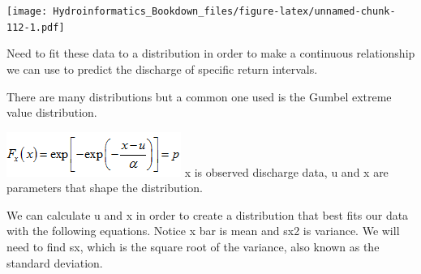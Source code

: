 \documentclass[
]{book}
\newenvironment{Shaded}{\begin{snugshade}}{\end{snugshade}}
\newcommand{\AttributeTok}[1]{\textcolor[rgb]{0.77,0.63,0.00}{#1}}
\newcommand{\CommentTok}[1]{\textcolor[rgb]{0.56,0.35,0.01}{\textit{#1}}}
\newcommand{\DecValTok}[1]{\textcolor[rgb]{0.00,0.00,0.81}{#1}}
\newcommand{\FloatTok}[1]{\textcolor[rgb]{0.00,0.00,0.81}{#1}}
\newcommand{\FunctionTok}[1]{\textcolor[rgb]{0.00,0.00,0.00}{#1}}
\newcommand{\NormalTok}[1]{#1}
\newcommand{\OtherTok}[1]{\textcolor[rgb]{0.56,0.35,0.01}{#1}}
\newcommand{\SpecialCharTok}[1]{\textcolor[rgb]{0.00,0.00,0.00}{#1}}
\begin{document}
\begin{Shaded}
\end{Shaded}

\texttt{[image: Hydroinformatics\_Bookdown\_files/figure-latex/unnamed-chunk-112-1.pdf]}

Need to fit these data to a distribution in order to make a continuous relationship we can use to predict the discharge of specific return intervals.

There are many distributions but a common one used is the Gumbel extreme value distribution.

\includegraphics{images/gumbel.png}
x is observed discharge data, u and x are parameters that shape the distribution.

We can calculate u and x in order to create a distribution that best fits our data with the following equations. Notice x bar is mean and sx2 is variance. We will need to find sx, which is the square root of the variance, also known as the standard deviation.
\end{document}
